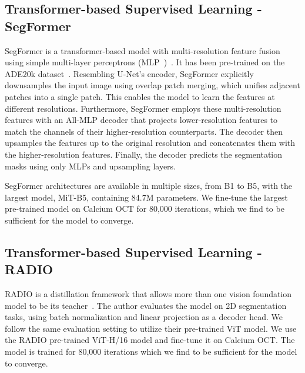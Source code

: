 \documentclass[a4paper,11pt,oneside]{report}
\begin{document}

\subsection{Transformer-based Supervised Learning - SegFormer}
SegFormer is a transformer-based model with multi-resolution feature fusion using simple multi-layer perceptrons (MLP~\cite{Rumelhart1986})~\cite{Xie2021SegFormer}. It has been pre-trained on the ADE20k dataset~\cite{Zhou2018}. Resembling U-Net's encoder, SegFormer explicitly downsamples the input image using overlap patch merging, which unifies adjacent patches into a single patch. This enables the model to learn the features at different resolutions. Furthermore, SegFormer employs these multi-resolution features with an All-MLP decoder that projects lower-resolution features to match the channels of their higher-resolution counterparts. The decoder then upsamples the features up to the original resolution and concatenates them with the higher-resolution features. Finally, the decoder predicts the segmentation masks using only MLPs and upsampling layers. 

SegFormer architectures are available in multiple sizes, from B1 to B5, with the largest model, MiT-B5, containing 84.7M parameters. We fine-tune the largest pre-trained model on Calcium OCT for 80,000 iterations, which we find to be sufficient for the model to converge.

\subsection{Transformer-based Supervised Learning - RADIO}
RADIO is a distillation framework that allows more than one vision foundation model to be its teacher~\cite{Ranzinger2024RADIO}. The author evaluates the model on 2D segmentation tasks, using batch normalization and linear projection as a decoder head. We follow the same evaluation setting to utilize their pre-trained ViT model. We use the RADIO pre-trained ViT-H/16 model and fine-tune it on Calcium OCT. The model is trained for 80,000 iterations which we find to be sufficient for the model to converge.
\end{document}
